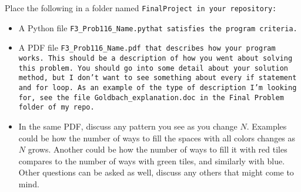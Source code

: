 \documentclass{article}
\newcommand\foldername{\tt{FinalProject} }
\newcommand\filename{\tt{F3\_Prob116\_Name.py}\;\;}
\begin{document}
	
	Place the following in a folder named \foldername in your repository:
	\begin{itemize}
		\item A Python file \filename  that satisfies the program criteria.
		\item A PDF file \tt{F3\_Prob116\_Name.pdf} that describes how your program works.  This should be a description of how you went about solving this problem.  You should go into some detail about your solution method, but I don't want to see something about every \tt{if} statement and \tt{for} loop.  As an example of the type of description I'm looking for, see the file \tt{Goldbach\_explanation.doc} in the \tt{Final Problem} folder of my repo.
		\item In the same PDF, discuss any pattern you see as you change $N$.  Examples could be how the number of ways to fill the spaces with all colors changes as $N$ grows.  Another could be how the number of ways to fill it with red tiles compares to the number of ways with green tiles, and similarly with blue.  Other questions can be asked as well, discuss any others that might come to mind.

	\end{itemize}

	
\end{document}

